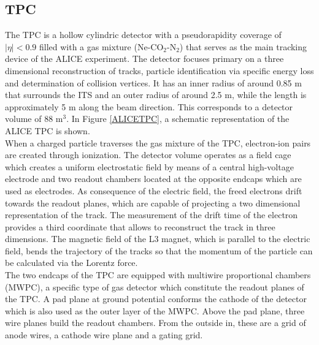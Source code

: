 \documentclass[12pt,a4paper]{report}
\begin{document}
\subsection{TPC}
The TPC is a hollow cylindric detector with a pseudorapidity coverage of $|\eta| < 0.9 $ filled with a gas mixture (Ne-CO$_2$-N$_2$) that serves as the main tracking device of the ALICE experiment. The detector focuses primary on a three dimensional reconstruction of tracks, particle identification via specific energy loss and determination of collision vertices. It has an inner radius of around 0.85 m that surrounds the ITS and an outer radius of around 2.5 m, while the length is approximately 5 m along the beam direction. This corresponds to a detector volume of 88 m$^3$. In Figure \ref{ALICETPC}, a schematic representation of the ALICE TPC is shown. \\
When a charged particle traverses the gas mixture of the TPC, electron-ion pairs are created through ionization. The detector volume operates as a field cage which creates a uniform electrostatic field by means of a central high-voltage electrode and two readout chambers located at the opposite endcaps which are used as electrodes. As consequence of the electric field, the freed electrons drift towards the readout planes, which are capable of projecting a two dimensional representation of the track. The measurement of the drift time of the electron provides a third coordinate that allows to reconstruct the track in three dimensions. The magnetic field of the L3 magnet, which is parallel to the electric field, bends the trajectory of the tracks so that the momentum of the particle can be calculated via the Lorentz force.\\
The two endcaps of the TPC are equipped with multiwire proportional chambers (MWPC), a specific type of gas detector which constitute the readout planes of the TPC. A pad plane at ground potential conforms  the cathode of the detector which is also used as the outer layer of the MWPC. Above the pad plane, three wire planes build the readout chambers. From the outside in, these are a grid of anode wires, a cathode wire plane and a gating grid. \\
\end{document}
